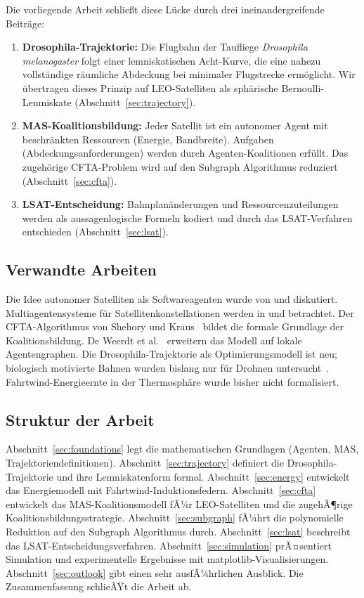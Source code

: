 ﻿\documentclass[a4paper,12pt]{article}
\theoremstyle{definition}
\begin{document}
Die vorliegende Arbeit schlie\ss t diese L\"ucke durch drei ineinandergreifende Beitr\"age:
\begin{enumerate}[label=(\roman*)]
  \item \textbf{Drosophila-Trajektorie:} Die Flugbahn der Taufliege \emph{Drosophila melanogaster}
    folgt einer lemniskatischen Acht-Kurve, die eine nahezu vollst\"andige r\"aumliche Abdeckung
    bei minimaler Flugstrecke erm\"oglicht. Wir \"ubertragen dieses Prinzip auf LEO-Satelliten
    als sph\"arische Bernoulli-Lemniskate (Abschnitt~\ref{sec:trajectory}).
  \item \textbf{MAS-Koalitionsbildung:} Jeder Satellit ist ein autonomer Agent mit beschr\"ankten
    Ressourcen (Energie, Bandbreite). Aufgaben (Abdeckungsanforderungen) werden durch
    Agenten-Koalitionen erf\"ullt. Das zugeh\"orige CFTA-Problem wird auf den Subgraph Algorithmus \cite{Epp2026} reduziert (Abschnitt~\ref{sec:cfta}).
  \item \textbf{LSAT-Entscheidung:} Bahnplan\"anderungen und Ressourcenzuteilungen werden
    als aussagenlogische Formeln kodiert und durch das LSAT-Verfahren \cite{Epp2026lsat}
    entschieden (Abschnitt~\ref{sec:lsat}).
\end{enumerate}

\subsection{Verwandte Arbeiten}

Die Idee autonomer Satelliten als Softwareagenten wurde von \cite{Wertz99} und \cite{Wertz12}
diskutiert. Multiagentensysteme f\"ur Satellitenkonstellationen werden in \cite{Rao95} und
\cite{Sycara98} betrachtet. Der CFTA-Algorithmus von Shehory und Kraus~\cite{SK98} bildet
die formale Grundlage der Koalitionsbildung. De Weerdt et al.~\cite{dZK07} erweitern das
Modell auf lokale Agentengraphen. Die Drosophila-Trajektorie als Optimierungsmodell
ist neu; biologisch motivierte Bahnen wurden bislang nur f\"ur Drohnen untersucht~\cite{Floreano15}.
Fahrtwind-Energieernte in der Thermosph\"are wurde bisher nicht formalisiert.

\subsection{Struktur der Arbeit}

Abschnitt~\ref{sec:foundations} legt die mathematischen Grundlagen (Agenten, MAS, Trajektoriendefinitionen). Abschnitt~\ref{sec:trajectory} definiert die Drosophila-Trajektorie und ihre Lemniskatenform formal. Abschnitt~\ref{sec:energy} entwickelt das Energiemodell mit Fahrtwind-Induktionsfedern. Abschnitt~\ref{sec:cfta} entwickelt das MAS-Koalitionsmodell fÃ¼r LEO-Satelliten und die zugehÃ¶rige Koalitionsbildungsstrategie. Abschnitt~\ref{sec:subgraph} fÃ¼hrt die polynomielle Reduktion auf den Subgraph Algorithmus durch. Abschnitt~\ref{sec:lsat} beschreibt das LSAT-Entscheidungsverfahren. Abschnitt~\ref{sec:simulation} prÃ¤sentiert Simulation und experimentelle Ergebnisse mit matplotlib-Visualisierungen. Abschnitt~\ref{sec:outlook} gibt einen sehr ausfÃ¼hrlichen Ausblick. Die Zusammenfassung schlieÃŸt die Arbeit ab.
\end{document}

